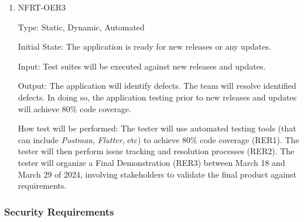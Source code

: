 \documentclass[12pt, titlepage]{article}
\begin{document}
\begin{enumerate}
\item{NFRT-OER3\\}

Type: Static, Dynamic, Automated

Initial State: The application is ready for new releases or any updates.
                
Input: Test suites will be executed against new releases and updates.
                
Output: The application will identify defects. The team will resolve identified defects. In doing so, the application testing prior to new releases and updates will achieve 80\% code coverage.
                
How test will be performed: The tester will use automated testing tools (that can include \textit{Postman}, \textit{Flutter}, etc) to achieve 80\% code coverage (RER1). The tester will then perform issue tracking and resolution processes (RER2). The tester will organize a Final Demonstration (RER3) between March 18 and March 29 of 2024, involving stakeholders to validate the final product against requirements.

\end{enumerate}

\subsubsection{Security Requirements}
\end{document}
